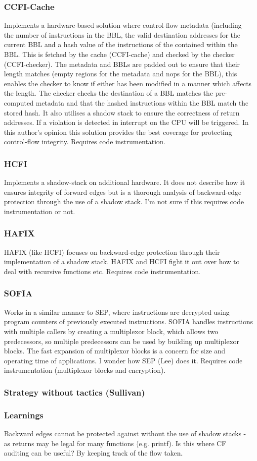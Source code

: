 \subsubsection{CCFI-Cache}
Implements a hardware-based solution where control-flow metadata (including the number of instructions in the BBL, the valid destination addresses for the current BBL and a hash value of the instructions of the contained within the BBL. This is fetched by the cache (CCFI-cache) and checked by the checker (CCFI-checker). The metadata and BBLs are padded out to ensure that their length matches (empty regions for the metadata and nops for the BBL), this enables the checker to know if either has been modified in a manner which affects the length. The checker checks the destination of a BBL matches the pre-computed metadata and that the hashed instructions within the BBL match the stored hash. It also utilises a shadow stack to ensure the correctness of return addresses. If a violation is detected in interrupt on the CPU will be triggered. In this author's opinion this solution provides the best coverage for protecting control-flow integrity. Requires code instrumentation.

\subsubsection{HCFI}
Implements a shadow-stack on additional hardware. It does not describe how it ensures integrity of forward edges but is a thorough analysis of backward-edge protection through the use of a shadow stack. I'm not sure if this requires code instrumentation or not.

\subsubsection{HAFIX}
HAFIX (like HCFI) focuses on backward-edge protection through their implementation of a shadow stack. HAFIX and HCFI fight it out over how to deal with recursive functions etc. Requires code instrumentation.

\subsubsection{SOFIA}
Works in a similar manner to SEP, where instructions are decrypted using program counters of previously executed instructions. SOFIA handles instructions with multiple callers by creating a multiplexor block, which allows two predecessors, so multiple predecessors can  be used by building up multiplexor blocks. The fast expansion of multiplexor blocks is a concern for size and operating time of applications. I wonder how SEP (Lee) does it. Requires code instrumentation (multiplexor blocks and encryption).

\subsubsection{Strategy without tactics (Sullivan)}

\subsubsection{Learnings}
Backward edges cannot be protected against without the use of shadow stacks - as returns may be legal for many functions (e.g. printf). Is this where CF auditing can be useful? By keeping track of the flow taken.
